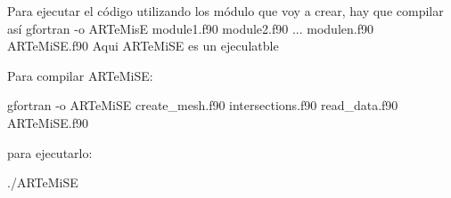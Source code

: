 Para ejecutar el código utilizando los módulo que voy a crear, hay que compilar así
gfortran -o ARTeMisE module1.f90  module2.f90 ... modulen.f90 ARTeMiSE.f90 
Aqui ARTeMiSE es un ejeculatble

Para compilar ARTeMiSE:

gfortran -o ARTeMiSE create_mesh.f90 intersections.f90 read_data.f90 ARTeMiSE.f90 

para ejecutarlo:

./ARTeMiSE

